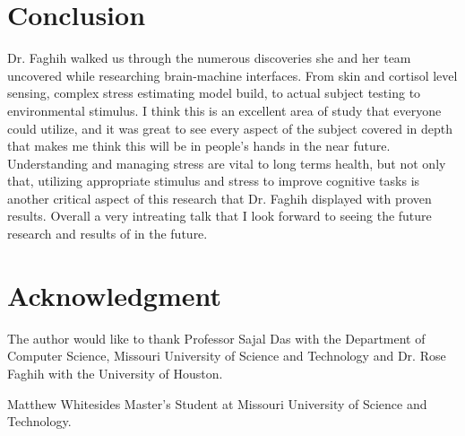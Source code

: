 \documentclass[journal,onecolumn]{IEEEtran}
\begin{document}
\section{Conclusion}

Dr. Faghih walked us through the numerous discoveries she and her team uncovered while researching brain-machine interfaces. From skin and cortisol level sensing, complex stress estimating model build, to actual subject testing to environmental stimulus. I think this is an excellent area of study that everyone could utilize, and it was great to see every aspect of the subject covered in depth that makes me think this will be in people's hands in the near future. Understanding and managing stress are vital to long terms health, but not only that, utilizing appropriate stimulus and stress to improve cognitive tasks is another critical aspect of this research that Dr. Faghih displayed with proven results. Overall a very intreating talk that I look forward to seeing the future research and results of in the future. 




\section*{Acknowledgment}
The author would like to thank Professor Sajal Das with the Department of Computer Science, Missouri University of Science and Technology and Dr. Rose Faghih with the University of Houston.

\ifCLASSOPTIONcaptionsoff
  \newpage
\fi




\begin{IEEEbiographynophoto}{Matthew Whitesides}
  Master's Student at Missouri University of Science and Technology.
\end{IEEEbiographynophoto}

\end{document}
